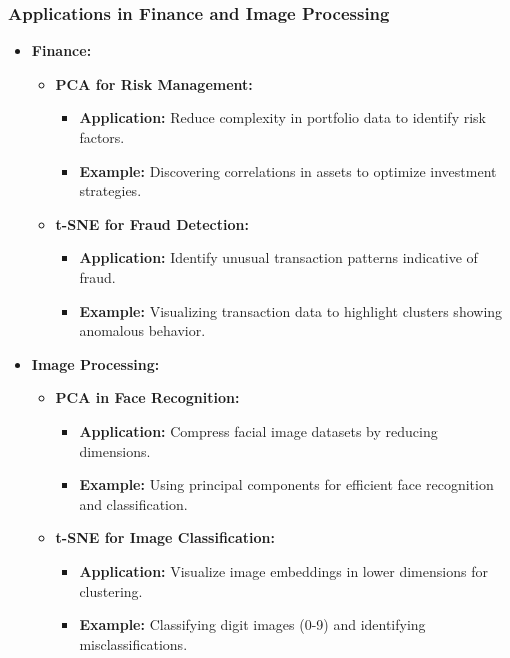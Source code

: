 \documentclass{beamer}
\begin{document}
\begin{frame}[fragile]
    \frametitle{Applications in Finance and Image Processing}
    \begin{itemize}
        \item \textbf{Finance:}
        \begin{itemize}
            \item \textbf{PCA for Risk Management:}
            \begin{itemize}
                \item \textbf{Application:} Reduce complexity in portfolio data to identify risk factors.
                \item \textbf{Example:} Discovering correlations in assets to optimize investment strategies.
            \end{itemize}
            \item \textbf{t-SNE for Fraud Detection:}
            \begin{itemize}
                \item \textbf{Application:} Identify unusual transaction patterns indicative of fraud.
                \item \textbf{Example:} Visualizing transaction data to highlight clusters showing anomalous behavior.
            \end{itemize}
        \end{itemize}

        \item \textbf{Image Processing:}
        \begin{itemize}
            \item \textbf{PCA in Face Recognition:}
            \begin{itemize}
                \item \textbf{Application:} Compress facial image datasets by reducing dimensions.
                \item \textbf{Example:} Using principal components for efficient face recognition and classification.
            \end{itemize}
            \item \textbf{t-SNE for Image Classification:}
            \begin{itemize}
                \item \textbf{Application:} Visualize image embeddings in lower dimensions for clustering.
                \item \textbf{Example:} Classifying digit images (0-9) and identifying misclassifications.
            \end{itemize}
        \end{itemize}
    \end{itemize}
\end{frame}
\end{document}
